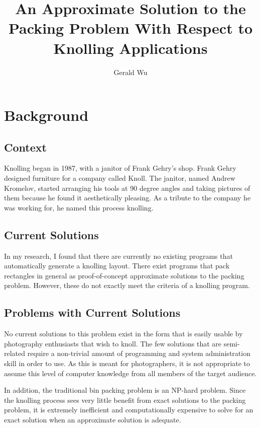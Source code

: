 \documentclass[10pt,titlepage,letterpaper]{article}
\begin{document}
	\setlength{\parskip}{1em}
	\title{An Approximate Solution to the Packing Problem With Respect to Knolling Applications}
	\author{Gerald Wu}
	\maketitle
	\tableofcontents
	\newpage

	\section{Background}
	\subsection{Context}
	Knolling began in 1987, with a janitor of Frank Gehry's shop. Frank Gehry designed furniture for a company called Knoll. The janitor, named Andrew Kromelov, started arranging his tools at 90 degree angles and taking pictures of them because he found it aesthetically pleasing. As a tribute to the company he was working for, he named this process knolling\cite{knolling}.
	\subsection{Current Solutions}
	In my research, I found that there are currently no existing programs that automatically generate a knolling layout. There exist programs that pack rectangles in general as proof-of-concept approximate solutions to the packing problem\cite{tilings}. However, these do not exactly meet the criteria of a knolling program.
	\subsection{Problems with Current Solutions}
	No current solutions to this problem exist in the form that is easily usable by photography enthusiasts that wish to knoll. The few solutions that are semi-related require a non-trivial amount of programming and system administration skill in order to use. As this is meant for photographers, it is not appropriate to assume this level of computer knowledge from all members of the target audience.\par
	In addition, the traditional bin packing problem is an NP-hard problem. Since the knolling process sees very little benefit from exact solutions to the packing problem, it is extremely inefficient and computationally expensive to solve for an exact solution when an approximate solution is adequate.
\end{document}
